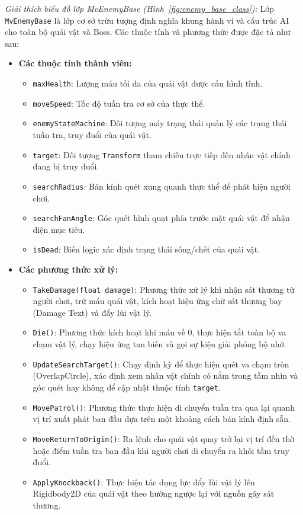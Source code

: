 \documentclass[../DoAn.tex]{subfiles}
\begin{document}
\textit{Giải thích biểu đồ lớp MvEnemyBase (Hình~\ref{fig:enemy_base_class}):}
Lớp \texttt{MvEnemyBase} là lớp cơ sở trừu tượng định nghĩa khung hành vi và cấu trúc AI cho toàn bộ quái vật và Boss. Các thuộc tính và phương thức được đặc tả như sau:
\begin{itemize}
    \item \textbf{Các thuộc tính thành viên:}
    \begin{itemize}
        \item \texttt{maxHealth}: Lượng máu tối đa của quái vật được cấu hình tĩnh.
        \item \texttt{moveSpeed}: Tốc độ tuần tra cơ sở của thực thể.
        \item \texttt{enemyStateMachine}: Đối tượng máy trạng thái quản lý các trạng thái tuần tra, truy đuổi của quái vật.
        \item \texttt{target}: Đối tượng \texttt{Transform} tham chiếu trực tiếp đến nhân vật chính đang bị truy đuổi.
        \item \texttt{searchRadius}: Bán kính quét xung quanh thực thể để phát hiện người chơi.
        \item \texttt{searchFanAngle}: Góc quét hình quạt phía trước mặt quái vật để nhận diện mục tiêu.
        \item \texttt{isDead}: Biến logic xác định trạng thái sống/chết của quái vật.
    \end{itemize}
    \item \textbf{Các phương thức xử lý:}
    \begin{itemize}
        \item \texttt{TakeDamage(float damage)}: Phương thức xử lý khi nhận sát thương từ người chơi, trừ máu quái vật, kích hoạt hiệu ứng chữ sát thương bay (Damage Text) và đẩy lùi vật lý.
        \item \texttt{Die()}: Phương thức kích hoạt khi máu về 0, thực hiện tắt toàn bộ va chạm vật lý, chạy hiệu ứng tan biến và gọi sự kiện giải phóng bộ nhớ.
        \item \texttt{UpdateSearchTarget()}: Chạy định kỳ để thực hiện quét va chạm tròn (OverlapCircle), xác định xem nhân vật chính có nằm trong tầm nhìn và góc quét hay không để cập nhật thuộc tính \texttt{target}.
        \item \texttt{MovePatrol()}: Phương thức thực hiện di chuyển tuần tra qua lại quanh vị trí xuất phát ban đầu dựa trên một khoảng cách bán kính định sẵn.
        \item \texttt{MoveReturnToOrigin()}: Ra lệnh cho quái vật quay trở lại vị trí đền thờ hoặc điểm tuần tra ban đầu khi người chơi di chuyển ra khỏi tầm truy đuổi.
        \item \texttt{ApplyKnockback()}: Thực hiện tác dụng lực đẩy lùi vật lý lên Rigidbody2D của quái vật theo hướng ngược lại với nguồn gây sát thương.
    \end{itemize}
\end{itemize}
\end{document}
